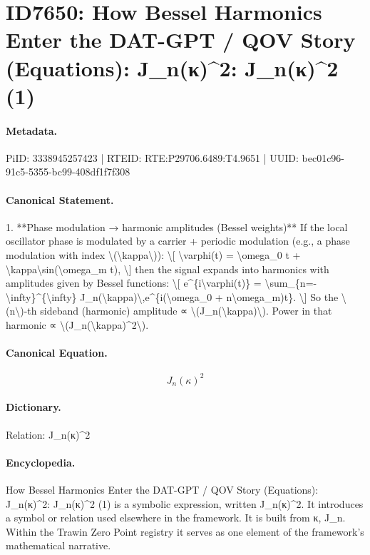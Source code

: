 \section*{ID7650: How Bessel Harmonics Enter the DAT-GPT / QOV Story (Equations): J\_n(κ)\textasciicircum{}2: J\_n(κ)\textasciicircum{}2 (1)}
\paragraph{Metadata.}
PiID: 3338945257423 | RTEID: RTE:P29706.6489:T4.9651 | UUID: bec01c96-91c5-5355-bc99-408df1f7f308

\paragraph{Canonical Statement.}
1. **Phase modulation → harmonic amplitudes (Bessel weights)** If the local oscillator phase is modulated by a carrier + periodic modulation (e.g., a phase modulation with index \textbackslash{}(\textbackslash{}kappa\textbackslash{})): \textbackslash{}[ \textbackslash{}varphi(t) = \textbackslash{}omega\_0 t + \textbackslash{}kappa\textbackslash{}sin(\textbackslash{}omega\_m t), \textbackslash{}] then the signal expands into harmonics with amplitudes given by Bessel functions: \textbackslash{}[ e\textasciicircum{}\{i\textbackslash{}varphi(t)\} = \textbackslash{}sum\_\{n=-\textbackslash{}infty\}\textasciicircum{}\{\textbackslash{}infty\} J\_n(\textbackslash{}kappa)\textbackslash{},e\textasciicircum{}\{i(\textbackslash{}omega\_0 + n\textbackslash{}omega\_m)t\}. \textbackslash{}] So the \textbackslash{}(n\textbackslash{})-th sideband (harmonic) amplitude ∝ \textbackslash{}(J\_n(\textbackslash{}kappa)\textbackslash{}). Power in that harmonic ∝ \textbackslash{}(J\_n(\textbackslash{}kappa)\textasciicircum{}2\textbackslash{}).

\paragraph{Canonical Equation.}
\[
J_n(\kappa)^2
\]

\paragraph{Dictionary.}
Relation: J\_n(κ)\textasciicircum{}2

\paragraph{Encyclopedia.}
How Bessel Harmonics Enter the DAT-GPT / QOV Story (Equations): J\_n(κ)\textasciicircum{}2: J\_n(κ)\textasciicircum{}2 (1) is a symbolic expression, written J\_n(κ)\textasciicircum{}2. It introduces a symbol or relation used elsewhere in the framework. It is built from κ, J\_n. Within the Trawin Zero Point registry it serves as one element of the framework's mathematical narrative.
